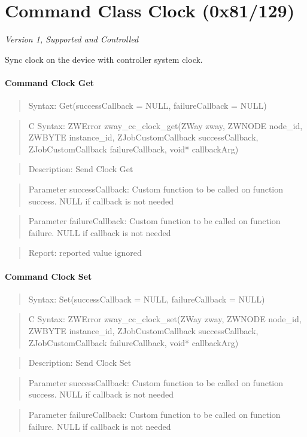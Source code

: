 \section{Command Class Clock (0x81/129)}

\textit{Version 1, Supported and Controlled}
\newline

Sync clock on the device with controller system clock.
\paragraph{Command Clock Get}
\begin{quote}Syntax: Get(successCallback = NULL, failureCallback = NULL)\end{quote}
\begin{quote}C Syntax: ZWError zway\_cc\_clock\_get(ZWay zway, ZWNODE node\_id, ZWBYTE instance\_id, ZJobCustomCallback successCallback, ZJobCustomCallback failureCallback, void* callbackArg)\end{quote}
\begin{quote}Description: Send Clock Get\end{quote}
\begin{quote}Parameter successCallback: Custom function to be called on function success. NULL if callback is not needed\end{quote}
\begin{quote}Parameter failureCallback: Custom function to be called on function failure. NULL if callback is not needed\end{quote}
\begin{quote}Report: reported value ignored\end{quote}

\paragraph{Command Clock Set}
\begin{quote}Syntax: Set(successCallback = NULL, failureCallback = NULL)\end{quote}
\begin{quote}C Syntax: ZWError zway\_cc\_clock\_set(ZWay zway, ZWNODE node\_id, ZWBYTE instance\_id, ZJobCustomCallback successCallback, ZJobCustomCallback failureCallback, void* callbackArg)\end{quote}
\begin{quote}Description: Send Clock Set\end{quote}
\begin{quote}Parameter successCallback: Custom function to be called on function success. NULL if callback is not needed\end{quote}
\begin{quote}Parameter failureCallback: Custom function to be called on function failure. NULL if callback is not needed\end{quote}



